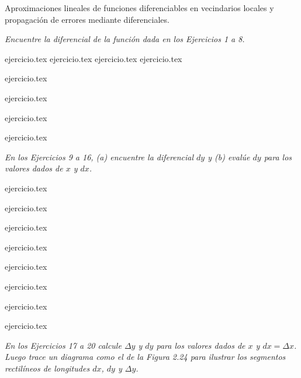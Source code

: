 
Aproximaciones lineales de funciones diferenciables en vecindarios locales y propagación de errores mediante diferenciales.

\noindent \textit{Encuentre la diferencial de la función dada en los Ejercicios 1 a 8.}

\begin{enumerate}
    \begin{minipage}{0.45\textwidth}
    {ejercicio.tex}
    {ejercicio.tex}
    {ejercicio.tex}
    {ejercicio.tex}
    \end{minipage}%
    \begin{minipage}{0.45\textwidth}
    \setcounter{enumi}{1}
    {ejercicio.tex}
    \addtocounter{enumi}{1}
    {ejercicio.tex}
    \addtocounter{enumi}{1}
    {ejercicio.tex}
    \addtocounter{enumi}{1}
    {ejercicio.tex}
    \end{minipage}
\end{enumerate}

\noindent \textit{En los Ejercicios 9 a 16, (a) encuentre la diferencial $dy$ y (b) evalúe $dy$ para los valores dados de $x$ y $dx$.}

\begin{enumerate}
    \begin{minipage}{0.45\textwidth}
    \setcounter{enumi}{8}
    {ejercicio.tex}
    \addtocounter{enumi}{1}
    {ejercicio.tex}
    \addtocounter{enumi}{1}
    {ejercicio.tex}
    \addtocounter{enumi}{1}
    {ejercicio.tex}
    \end{minipage}%
    \begin{minipage}{0.45\textwidth}
    \setcounter{enumi}{9}
    {ejercicio.tex}
    \addtocounter{enumi}{1}
    {ejercicio.tex}
    \addtocounter{enumi}{1}
    {ejercicio.tex}
    \addtocounter{enumi}{1}
    {ejercicio.tex}
    \end{minipage}
\end{enumerate}

\noindent \textit{En los Ejercicios 17 a 20 calcule $\Delta y$ y $dy$ para los valores dados de $x$ y $dx = \Delta x$. Luego trace un diagrama como el de la Figura 2.24 para ilustrar los segmentos rectilíneos de longitudes $dx$, $dy$ y $\Delta y$.}

